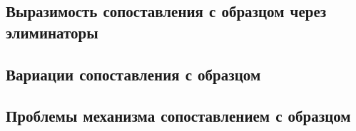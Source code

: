 \documentclass[14pt, a4paper]{extarticle}
\begin{document}
\subsection{Выразимость сопоставления с образцом через элиминаторы}


\subsection{Вариации сопоставления с образцом}


\subsection{Проблемы механизма сопоставлением с образцом}


\newpage


\end{document}
